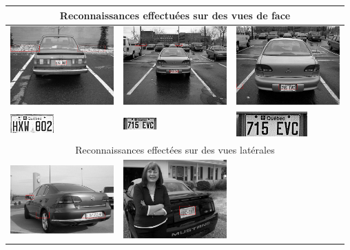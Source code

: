 \documentclass[a4paper,10pt,twocolumn]{article}
\begin{document}
\begin{table}[ht]
  \centering
  \begin{tabular}{|m{150px}|m{150px}|m{150px}|}
    \hline
    \multicolumn{3}{|c|}{Reconnaissances effectuées sur des vues de face}\\
    \hline
	  \includegraphics[width=150px]{img/plate_detect_0.png}&
	  \includegraphics[width=150px]{img/plate_detect_1.png}&
	  \includegraphics[width=150px]{img/plate_detect_2.png}\tabularnewline
	  \includegraphics[scale=1]{img/plate_0.png}&
	  \includegraphics[scale=1]{img/plate_1.png}&
	  \includegraphics[scale=1]{img/plate_2.png}\tabularnewline
	  \hline
	  \multicolumn{3}{|c|}{Reconnaissances effectées sur des vues latérales}\\
	  \hline
	  \includegraphics[width=150px]{img/plate_detect_3.png}&
	  \includegraphics[width=150px]{img/plate_detect_4.png}&

\end{tabular}
\end{table}
\end{document}
